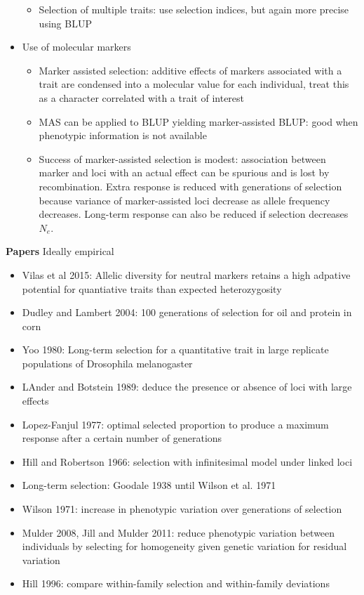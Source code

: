 \documentclass[12pt]{amsart}
\begin{document}
\begin{itemize}
\begin{itemize}
\item Selection of multiple traits: use selection indices, but again more precise using BLUP
\end{itemize}
\item Use of molecular markers
\begin{itemize}
\item Marker assisted selection: additive effects of markers associated with a trait are condensed into a molecular value for each individual, treat this as a character correlated with a trait of interest
\item MAS can be applied to BLUP yielding marker-assisted BLUP: good when phenotypic information is not available 
\item Success of marker-assisted selection is modest: association between marker and loci with an actual effect can be spurious and is lost by recombination. Extra response is reduced with generations of selection because variance of marker-assisted loci decrease as allele frequency decreases. Long-term response can also be reduced if selection decreases $N_e$. 
\end{itemize}
\end{itemize}

{\large \bf Papers}
Ideally empirical
\begin{itemize}
\item Vilas et al 2015: Allelic diversity for neutral markers retains a high adpative potential for quantiative traits than expected heterozygosity
\item Dudley and Lambert 2004: 100 generations of selection for oil and protein in corn
\item Yoo 1980: Long-term selection for a quantitative trait in large replicate populations of Drosophila melanogaster
\item LAnder and Botstein 1989: deduce the presence or absence of loci with large effects 
\item Lopez-Fanjul 1977: optimal selected proportion to produce a maximum response after a certain number of generations
\item Hill and Robertson 1966: selection with infinitesimal model under linked loci 
\item Long-term selection: Goodale 1938 until Wilson et al. 1971
\item Wilson 1971: increase in phenotypic variation over generations of selection 
\item Mulder 2008, Jill and Mulder 2011: reduce phenotypic variation between individuals by selecting for homogeneity given genetic variation for residual variation 
\item Hill 1996: compare within-family selection and within-family deviations 
\end{itemize}
\end{document}
